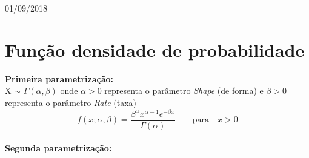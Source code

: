 \begin{titlepage}

{\large 01/09/2018}\\[2cm] %


 

\vfill %

\end{titlepage}


\section{Função densidade de probabilidade}

\textbf{Primeira parametrização:}\\

X $\sim$ \begin{math} \Gamma(\alpha, \beta) \end{math} onde \begin{math} \alpha > 0 \end{math} representa o parâmetro \textit{Shape} (de forma) e \begin{math} \beta > 0 \end{math} representa o parâmetro \textit{Rate} (taxa)
\begin{equation}
f(x; \alpha, \beta )=\frac{\beta^{\alpha}x^{\alpha-1}e^{-\beta x}}{\Gamma(\alpha)} \qquad \text{para} \quad x > 0
\end{equation}\\

\textbf{Segunda parametrização:}\\

